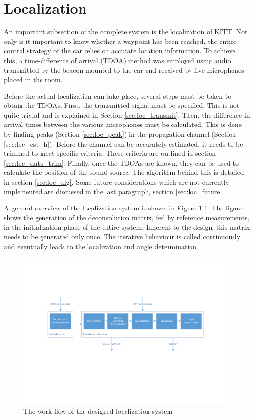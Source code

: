 \documentclass[11pt,titlepage]{report}
\begin{document}
\chapter{Localization}
\label{ch:localization}
An important subsection of the complete system is the localization of KITT. Not only is it important to know whether a waypoint has been reached, the entire control strategy of the car relies on accurate location information. To achieve this, a time-difference of arrival (TDOA) method was employed using audio transmitted by the beacon mounted to the car and received by five microphones placed in the room.

Before the actual localization can take place, several steps must be taken to obtain the TDOAs. First, the transmitted signal must be specified. This is not quite trivial and is explained in Section \ref{sec:loc_transmit}. Then, the difference in arrival times between the various microphones must be calculated. This is done by finding peaks (Section \ref{sec:loc_peak}) in the propagation channel (Section \ref{sec:loc_est_h}). Before the channel can be accurately estimated, it needs to be trimmed to meet specific criteria. These criteria are outlined in section \ref{sec:loc_data_trim}. Finally, once the TDOAs are known, they can be used to calculate the position of the sound source. The algorithm behind this is detailed in section \ref{sec:loc_alg}. Some future considerations which are not currently implemented are discussed in the last paragraph, section \ref{sec:loc_future}.

A general overview of the localization system is shown in Figure \ref{fig:localization-overview}. The figure shows the generation of the deconvolution matrix, fed by reference measurements, in the initialization phase of the entire system. Inherent to the design, this matrix needs to be generated only once. The iterative behaviour is called continuously and eventually leads to the localization and angle determination.
\begin{figure}[H]
	\centering
	\includegraphics[width=\linewidth]{resource/localization-overview.pdf}
	\caption{The work flow of the designed localization system}
	\label{fig:localization-overview}
\end{figure}
\end{document}
